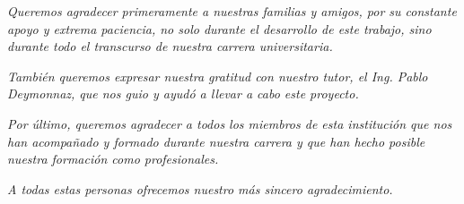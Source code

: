 \begin{center}

\textit{
  Queremos agradecer primeramente a nuestras familias y amigos, por su constante apoyo y extrema
  paciencia, no solo durante el desarrollo de este trabajo, sino durante todo el transcurso de
  nuestra carrera universitaria.}

\textit{También queremos expresar nuestra gratitud con nuestro tutor, el Ing. Pablo Deymonnaz,
que nos guio y ayudó a llevar a cabo este proyecto.}

\textit{Por último, queremos agradecer a todos los miembros de esta institución que nos han acompañado
y formado durante nuestra carrera y que han hecho posible nuestra formación como profesionales.}

\textit{A todas estas personas ofrecemos nuestro más sincero agradecimiento.}
\end{center}
